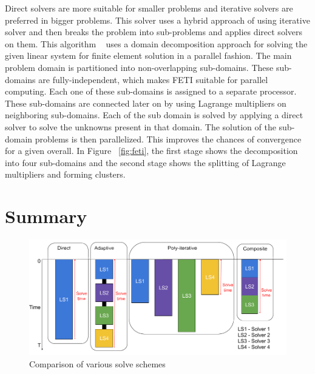 Direct solvers are more suitable for smaller problems and iterative solvers are preferred in bigger problems. This solver uses a hybrid approach of using iterative solver and then breaks the problem into sub-problems and applies direct solvers on them. This algorithm ~\cite{feti1, feti2} uses a domain decomposition approach for solving the given linear system for finite element solution in a parallel fashion. The main problem domain is partitioned into non-overlapping sub-domains. These sub-domains are fully-independent, which makes FETI suitable for parallel computing. Each one of these sub-domains is assigned to a separate processor. These sub-domains are connected later on by using Lagrange multipliers on neighboring sub-domains. Each of the sub domain is solved by applying a direct solver to solve the unknowns present in that domain. The solution of the sub-domain problems is then parallelized. This improves the chances of convergence for a given overall. In Figure ~\ref{fig:feti}, the first stage shows the decomposition into four sub-domains and the second stage shows the splitting of Lagrange multipliers and forming clusters. 


\section{Summary}

\begin{figure}[H]
\begin{center}
 \includegraphics[width=0.95\linewidth]{figures/SolversComparison1.png}
\end{center}
 \caption{Comparison of various solve schemes}
 \label{fig:comparison}
\end{figure}

